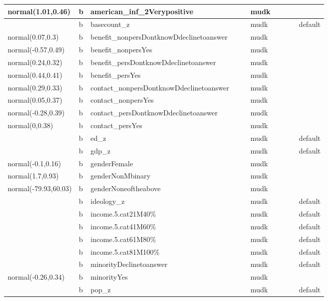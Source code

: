 \documentclass[
]{book}
\theoremstyle{definition}
\theoremstyle{definition}
\theoremstyle{definition}
\theoremstyle{definition}
\theoremstyle{remark}
\begin{document}
\begin{table}
\begin{tabular}[t]{l|l|l|l|l|l|l|l|l|l}
\hline
normal(1.01,0.46) & b & american\_inf\_2Verypositive &  &  & mudk &  &  &  & \\
\hline
 & b & basecount\_z &  &  & mudk &  &  &  & default\\
\hline
normal(0.07,0.3) & b & benefit\_nonpersDontknowDdeclinetoanswer &  &  & mudk &  &  &  & \\
\hline
normal(-0.57,0.49) & b & benefit\_nonpersYes &  &  & mudk &  &  &  & \\
\hline
normal(0.24,0.32) & b & benefit\_persDontknowDdeclinetoanswer &  &  & mudk &  &  &  & \\
\hline
normal(0.44,0.41) & b & benefit\_persYes &  &  & mudk &  &  &  & \\
\hline
normal(0.29,0.33) & b & contact\_nonpersDontknowDdeclinetoanswer &  &  & mudk &  &  &  & \\
\hline
normal(0.05,0.37) & b & contact\_nonpersYes &  &  & mudk &  &  &  & \\
\hline
normal(-0.28,0.39) & b & contact\_persDontknowDdeclinetoanswer &  &  & mudk &  &  &  & \\
\hline
normal(0,0.38) & b & contact\_persYes &  &  & mudk &  &  &  & \\
\hline
 & b & ed\_z &  &  & mudk &  &  &  & default\\
\hline
 & b & gdp\_z &  &  & mudk &  &  &  & default\\
\hline
normal(-0.1,0.16) & b & genderFemale &  &  & mudk &  &  &  & \\
\hline
normal(1.7,0.93) & b & genderNonMbinary &  &  & mudk &  &  &  & \\
\hline
normal(-79.93,60.03) & b & genderNoneoftheabove &  &  & mudk &  &  &  & \\
\hline
 & b & ideology\_z &  &  & mudk &  &  &  & default\\
\hline
 & b & income.5.cat21M40\% &  &  & mudk &  &  &  & default\\
\hline
 & b & income.5.cat41M60\% &  &  & mudk &  &  &  & default\\
\hline
 & b & income.5.cat61M80\% &  &  & mudk &  &  &  & default\\
\hline
 & b & income.5.cat81M100\% &  &  & mudk &  &  &  & default\\
\hline
 & b & minorityDeclinetoanswer &  &  & mudk &  &  &  & default\\
\hline
normal(-0.26,0.34) & b & minorityYes &  &  & mudk &  &  &  & \\
\hline
 & b & pop\_z &  &  & mudk &  &  &  & default\\

\end{tabular}
\end{table}
\end{document}

